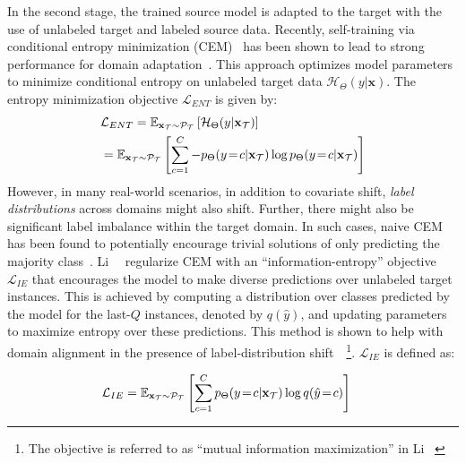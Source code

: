 \documentclass[10pt,twocolumn,letterpaper]{article}
\newcommand{\numclasses}{C}  \newcommand{\featext}{\phi}  \newcommand{\featsize}{D}  \newcommand{\model}{h}  \newcommand{\modelparams}{\Theta}  \newcommand{\timestep}{\rho}
\begin{document}
In the second stage, the trained source model is adapted to the target with the use of unlabeled target and labeled source data. 
Recently, self-training via conditional entropy minimization (CEM)~\cite{grandvalet2005semi} has been shown to lead to strong performance for domain adaptation~\cite{saito2019semi}. This approach optimizes model parameters to minimize conditional entropy on unlabeled target data $\mathcal{H}_{\modelparams}(y|\mathbf{x})$. The entropy minimization objective $\mathcal{L}_{ENT}$ is given by:
\begin{equation}
    \vspace{-2pt}
\begin{aligned}        
    &  \mathcal{L}_{ENT} = \mathbb{E}_{\mathbf{x}_\target \sim \mathcal{P}_\target} \left[\mathcal{H}_{\modelparams}(y|\mathbf{x}_\target)\right] \\
        & = \mathbb{E}_{\mathbf{x}_\target \sim \mathcal{P}_\target} \left[\sum_{c=1}^{\numclasses} - p_{\modelparams}(y\!=\!c|\mathbf{x}_\target) \log p_{\modelparams}(y\!=\!c|\mathbf{x}_\target)\right]
\end{aligned}
\label{eq:ent}
\end{equation}
However, in many real-world scenarios, in addition to covariate shift, \emph{label distributions} across domains might also shift. Further, there might also be significant label imbalance within the target domain. In such cases, naive CEM has been found to potentially encourage trivial solutions of only predicting the majority class~\cite{li2020rethinking}. Li~\etal~\cite{li2020rethinking} regularize CEM with an ``information-entropy'' objective $\mathcal{L}_{IE}$ that encourages the model to make diverse predictions over unlabeled target instances. This is achieved by computing a distribution over classes predicted by the model for the last-$Q$ instances, denoted by $q(\hat{y})$, and updating parameters to maximize entropy over these predictions. This method is shown to help with domain alignment in the presence of label-distribution shift~\cite{li2020rethinking}~\footnote{The objective is referred to as ``mutual information maximization'' in Li \etal~\cite{li2020rethinking}}. $\mathcal{L}_{IE}$ is defined as:

\vspace{-5pt}
\begin{equation}
\begin{aligned}        
    \mathcal{L}_{IE} & = \mathbb{E}_{\mathbf{x}_\target \sim \mathcal{P}_\target} \left[\sum_{c=1}^{\numclasses} p_{\modelparams}(y\!=\!c|\mathbf{x}_\target) \log q(\hat{y}\!=\!c)\right]
\end{aligned}
\label{eq:ie}
\end{equation}
\end{document}
